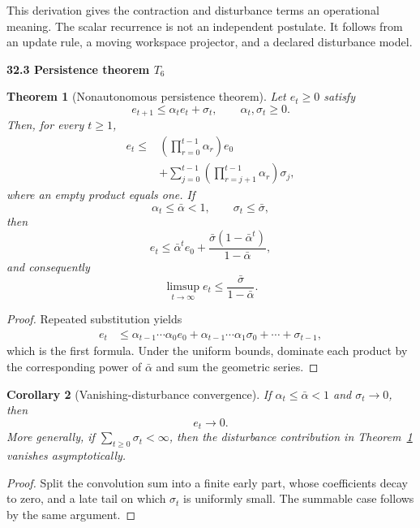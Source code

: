 \documentclass[11pt,letterpaper]{article}
\newcommand{\subtopic}[1]{%
 \vspace{0.45em}
 {\bfseries\color{AccentColor} #1\par}
}
\theoremstyle{plain}
\newtheorem{theorem}{Theorem}
\newtheorem{corollary}[theorem]{Corollary}
\theoremstyle{definition}
\begin{document}
This derivation gives the contraction and disturbance terms an operational
meaning. The scalar recurrence is not an independent postulate. It follows
from an update rule, a moving workspace projector, and a declared disturbance
model.

\subtopic{32.3 Persistence theorem \(T_6\)}

\begin{theorem}[Nonautonomous persistence theorem]\label{thm:persistence}
Let \(e_t\geq0\) satisfy
\[
e_{t+1}\leq\alpha_te_t+\sigma_t,
\qquad
\alpha_t,\sigma_t\geq0.
\]
Then, for every \(t\geq1\),
\[
\boxed{
\begin{aligned}
e_t
\leq
&\left(\prod_{r=0}^{t-1}\alpha_r\right)e_0\\
&+
\sum_{j=0}^{t-1}
\left(\prod_{r=j+1}^{t-1}\alpha_r\right)\sigma_j,
\end{aligned}
}
\]
where an empty product equals one. If
\[
\alpha_t\leq\bar\alpha<1,
\qquad
\sigma_t\leq\bar\sigma,
\]
then
\[
\boxed{
e_t
\leq
\bar\alpha^te_0
+
\frac{\bar\sigma(1-\bar\alpha^t)}{1-\bar\alpha},
}
\]
and consequently
\[
\boxed{
\limsup_{t\to\infty}e_t
\leq
\frac{\bar\sigma}{1-\bar\alpha}.
}
\]
\end{theorem}

\begin{proof}
Repeated substitution yields
\[
\begin{aligned}
e_t
&\leq
\alpha_{t-1}\cdots\alpha_0e_0
+
\alpha_{t-1}\cdots\alpha_1\sigma_0
+
\cdots
+
\sigma_{t-1},
\end{aligned}
\]
which is the first formula. Under the uniform bounds, dominate each product by
the corresponding power of \(\bar\alpha\) and sum the geometric series.
\end{proof}

\begin{corollary}[Vanishing-disturbance convergence]\label{cor:vanishing-disturbance}
If \(\alpha_t\leq\bar\alpha<1\) and \(\sigma_t\to0\), then
\[
e_t\to0.
\]
More generally, if \(\sum_{t\geq0}\sigma_t<\infty\), then the disturbance
contribution in Theorem~\ref{thm:persistence} vanishes asymptotically.
\end{corollary}

\begin{proof}
Split the convolution sum into a finite early part, whose coefficients decay
to zero, and a late tail on which \(\sigma_t\) is uniformly small. The
summable case follows by the same argument.
\end{proof}
\end{document}
